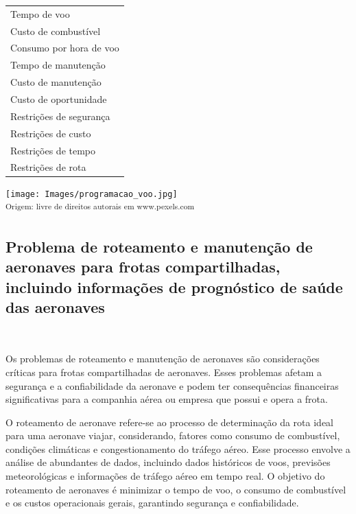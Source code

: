 \documentclass{abntex2}
\begin{document}
\begin{sloppypar}
\begin{minipage}[h]{.98\linewidth}
	\begin{minipage}[t]{0.25\linewidth}
		\begin{tabular}{l}
		Tempo de voo\\
		Custo de combustível\\
		Consumo por hora de voo\\
		Tempo de manutenção\\
		Custo de manutenção\\
		Custo de oportunidade\\
		Restrições de segurança\\
		Restrições de custo\\
		Restrições de tempo\\
		Restrições de rota\\
		\end{tabular}
	\end{minipage}
	\hfill
	\begin{minipage}[t]{0.72\linewidth}
		\vspace{-2ex}
		\texttt{[image: Images/programacao\_voo.jpg]}\\
		\small\textsuperscript{Origem: livre de direitos autorais em www.pexels.com}
	\end{minipage}
\end{minipage}



\subsection{Problema de roteamento e manutenção de aeronaves para frotas compartilhadas, incluindo informações de prognóstico de saúde das aeronaves}\

Os problemas de roteamento e manutenção de aeronaves são considerações críticas para frotas compartilhadas de aeronaves. Esses problemas afetam a segurança e a confiabilidade da aeronave e podem ter consequências financeiras significativas para a companhia aérea ou empresa que possui e opera a frota.

O roteamento de aeronave refere-se ao processo de determinação da rota ideal para uma aeronave viajar, considerando, fatores como consumo de combustível, condições climáticas e congestionamento do tráfego aéreo. Esse processo envolve a análise de abundantes de dados, incluindo dados históricos de voos, previsões meteorológicas e informações de tráfego aéreo em tempo real. O objetivo do roteamento de aeronaves é minimizar o tempo de voo, o consumo de combustível e os custos operacionais gerais, garantindo segurança e confiabilidade.


\end{sloppypar}
\end{document}
